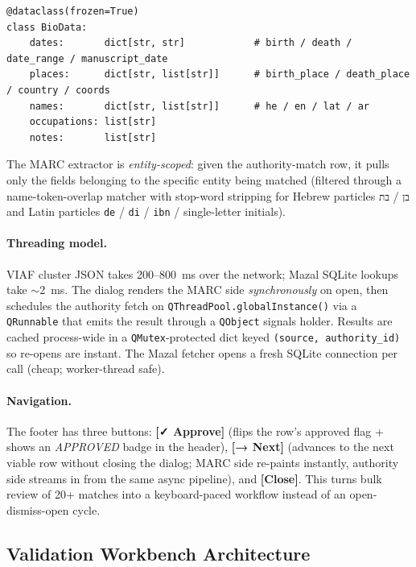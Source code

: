 \documentclass[12pt]{article}
\newcommand{\code}[1]{\texttt{#1}}
\begin{document}
\begin{lstlisting}[basicstyle=\ttfamily\small, frame=single]
@dataclass(frozen=True)
class BioData:
    dates:       dict[str, str]            # birth / death / date_range / manuscript_date
    places:      dict[str, list[str]]      # birth_place / death_place / country / coords
    names:       dict[str, list[str]]      # he / en / lat / ar
    occupations: list[str]
    notes:       list[str]
\end{lstlisting}

The MARC extractor is \emph{entity-scoped}: given the authority-match row, it pulls only the fields belonging to the specific entity being matched (filtered through a name-token-overlap matcher with stop-word stripping for Hebrew particles \code{בן} / \code{בת} and Latin particles \code{de} / \code{di} / \code{ibn} / single-letter initials).

\paragraph{Threading model.}
VIAF cluster JSON takes 200--800~ms over the network; Mazal SQLite lookups take $\sim$2~ms. The dialog renders the MARC side \emph{synchronously} on open, then schedules the authority fetch on \code{QThreadPool.globalInstance()} via a \code{QRunnable} that emits the result through a \code{QObject} signals holder. Results are cached process-wide in a \code{QMutex}-protected dict keyed \code{(source, authority\_id)} so re-opens are instant. The Mazal fetcher opens a fresh SQLite connection per call (cheap; worker-thread safe).

\paragraph{Navigation.}
The footer has three buttons: \textbf{[✓ Approve]} (flips the row's approved flag + shows an \emph{APPROVED} badge in the header), \textbf{[→ Next]} (advances to the next viable row without closing the dialog; MARC side re-paints instantly, authority side streams in from the same async pipeline), and \textbf{[Close]}. This turns bulk review of 20+ matches into a keyboard-paced workflow instead of an open-dismiss-open cycle.

\subsection{Validation Workbench Architecture}
\label{sec:validation-workbench}
\end{document}
